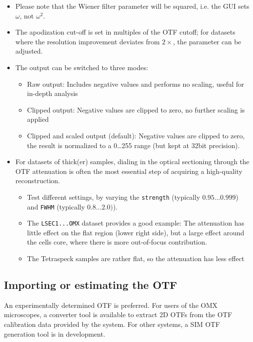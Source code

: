 \documentclass[twoside=false,
           twocolumn=false,
           a4paper,DIV=15,
           10pt]{scrartcl}
\begin{document}
\begin{itemize}
\item Please note that the Wiener filter
parameter will be squared, i.e. the GUI sets $\omega$, 
not $\omega^2$. 
\item The apodization cut-off is set in
multiples of the OTF cutoff; for datasets where
the resolution improvement deviates from $2\times$,
the parameter can be adjusted.
\item The output can be switched to three modes:
\begin{itemize}
\item Raw output: Includes negative values and performs
no scaling, useful for in-depth analysis
\item Clipped output: Negative values are clipped to zero,
no further scaling is applied
\item Clipped and scaled output (default): Negative values
are clipped to zero, the result is normalized to a 0\dots255
range (but kept at 32bit precision).
\end{itemize}
\item For datasets of thick(er) samples, dialing in the optical
sectioning through the OTF attenuation is often 
the most essential step of acquiring a high-quality reconstruction. 
\begin{itemize}
\item Test different
settings, by varying the \verb+strength+ 
(typically $0.95\dots0.999$) 
and \verb+FWHM+ (typically $0.8\dots2.0)$).
\item The \verb+LSEC1...OMX+ dataset provides
a good example: The attenuation has little effect
on the flat region (lower right side), but a large
effect around the cells core, where there is more
out-of-focus contribution.
\item The Tetraspeck samples are rather flat,
so the attenuation has less effect
\end{itemize}
\end{itemize}

\subsection{Importing or estimating the OTF}

An experimentally determined OTF is preferred. For users of the OMX microscopes, a converter tool is available to extract 2D OTFs from the OTF calibration data provided by the system. For other systems,
a SIM OTF generation tool is in development.
\end{document}
